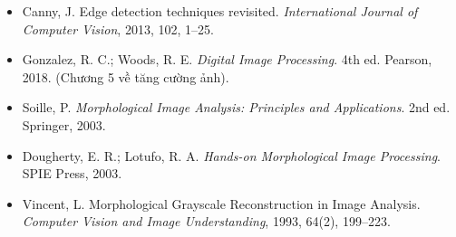 \begin{itemize}
	\item Canny, J. Edge detection techniques revisited. \textit{International Journal of Computer Vision}, 2013, 102, 1–25.
	\item Gonzalez, R. C.; Woods, R. E. \textit{Digital Image Processing}. 4th ed. Pearson, 2018. (Chương 5 về tăng cường ảnh).
	\item Soille, P. \textit{Morphological Image Analysis: Principles and Applications}. 2nd ed. Springer, 2003.
	\item Dougherty, E. R.; Lotufo, R. A. \textit{Hands-on Morphological Image Processing}. SPIE Press, 2003.
	\item Vincent, L. Morphological Grayscale Reconstruction in Image Analysis. \textit{Computer Vision and Image Understanding}, 1993, 64(2), 199–223.
\end{itemize}
